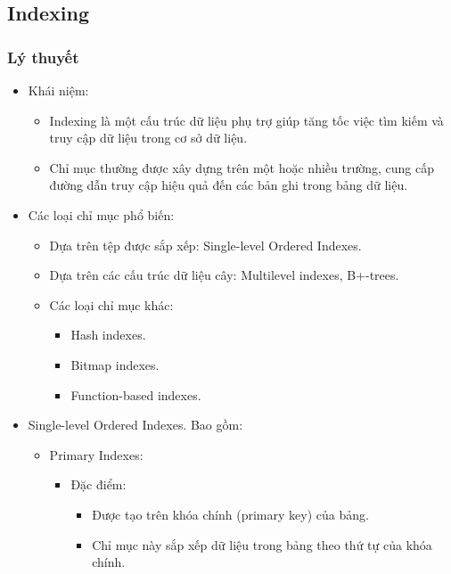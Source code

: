 \subsection{Indexing}
\subsubsection{Lý thuyết}
\begin{itemize}
    \item Khái niệm:
        \begin{itemize}
            \item Indexing là một cấu trúc dữ liệu phụ trợ giúp tăng tốc việc tìm kiếm và truy cập dữ liệu trong cơ sở dữ liệu.
            \item Chỉ mục thường được xây dựng trên một hoặc nhiều trường, cung cấp đường dẫn truy cập hiệu quả đến các bản ghi trong bảng dữ liệu.
        \end{itemize}
    \item Các loại chỉ mục phổ biến: 
        \begin{itemize}
            \item Dựa trên tệp được sắp xếp: Single-level Ordered Indexes.
            \item Dựa trên các cấu trúc dữ liệu cây: Multilevel indexes, B+-trees.
            \item Các loại chỉ mục khác:
                \begin{itemize}
                    \item Hash indexes.
                    \item Bitmap indexes.
                    \item Function-based indexes.
                \end{itemize}
        \end{itemize}
    \item Single-level Ordered Indexes. Bao gồm: 
        \begin{itemize}
            \item Primary Indexes: 
                \begin{itemize}
                    \item Đặc điểm:
                        \begin{itemize}
                            \item Được tạo trên khóa chính (primary key) của bảng.
                            \item Chỉ mục này sắp xếp dữ liệu trong bảng theo thứ tự của khóa chính.

\end{itemize}
\end{itemize}
\end{itemize}
\end{itemize}
